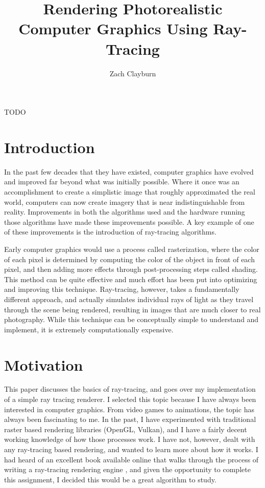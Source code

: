 \documentclass{IEEEtran}
\title{Rendering Photorealistic Computer Graphics Using Ray-Tracing}
\author{Zach Clayburn}
\renewenvironment{abstract}{
    \small
    \begin{center}
    \bfseries \abstractname\vspace{-.5em}\vspace{0pt}
    \end{center}
    \list{}{%
        \setlength{\leftmargin}{4mm}
        \setlength{\rightmargin}{\leftmargin}
    }
    \item\relax
}{\endlist}
\begin{document}
\maketitle


\begin{abstract}

TODO %


\end{abstract}

\section*{Introduction}

In the past few decades that they have existed, computer graphics have evolved and improved far
beyond what was initially possible. Where it once was an accomplishment to create a simplistic image
that roughly approximated the real world, computers can now create imagery that is near
indistinguishable from reality. Improvements in both the algorithms used and the hardware running
those algorithms have made these improvements possible. A key example of one of these improvements
is the introduction of ray-tracing algorithms.

Early computer graphics would use a process called rasterization, where the color of each pixel is
determined by computing the color of the object in front of each pixel, and then adding more effects
through post-processing steps called shading. This method can be quite effective and much effort has
been put into optimizing and improving this technique. Ray-tracing, however, takes a fundamentally
different approach, and actually simulates individual rays of light as they travel through the scene
being rendered, resulting in images that are much closer to real photography. While this technique
can be conceptually simple to understand and implement, it is extremely computationally expensive.

\section*{Motivation}

This paper discusses the basics of ray-tracing, and goes over my implementation of a simple ray
tracing renderer. I selected this topic because I have always been interested in computer graphics.
From video games to animations, the topic has always been fascinating to me. In the past, I have
experimented with traditional raster based rendering libraries (OpenGL, Vulkan), and I have a fairly
decent working knowledge of how those processes work. I have not, however, dealt with any
ray-tracing based rendering, and wanted to learn more about how it works. I had heard of an
excellent book available online that walks through the process of writing a ray-tracing rendering
engine \cite{Shirley2020RTW1}, and given the opportunity to complete this assignment, I decided this
would be a great algorithm to study.
\end{document}
